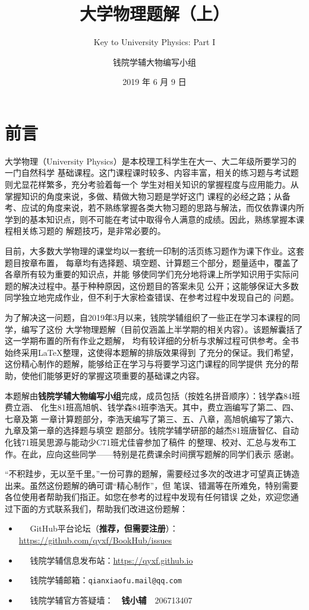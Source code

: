 \documentclass[b5paper,opensource,sourcefont,parskip]{qyxf-book}
\title{大学物理题解（上）}
\subtitle{Key to University Physics: Part I}
\author{钱院学辅大物编写小组}
\date{2019 年 6 月 9 日}
\begin{document}
\maketitle

\pagestyle{plain}
\chapter*{前言}
大学物理（University Physics）是本校理工科学生在大一、大二年级所要学习的一门自然科学
基础课程。这门课程课时较多、内容丰富，相关的练习题与考试题则尤显花样繁多，充分考验着每一个
学生对相关知识的掌握程度与应用能力。从掌握知识的角度来说，多做、精做大物习题是学好这门
课程的必经之路；从备考、应试的角度来说，若不熟练掌握各类大物习题的思路与解法，而仅依靠课内所
学到的基本知识点，则不可能在考试中取得令人满意的成绩。因此，熟练掌握本课程相关练习题的
解题技巧，是非常必要的。

目前，大多数大学物理的课堂均以一套统一印制的活页练习题作为课下作业。这套题目按章布置，
每章均有选择题、填空题、计算题三个部分，题量适中，覆盖了各章所有较为重要的知识点，并能
够使同学们充分地将课上所学知识用于实际问题的解决过程中。基于种种原因，这份题目的答案未见
公开；这能够保证大多数同学独立地完成作业，但不利于大家检查错误、在参考过程中发现自己的
问题。

为了解决这一问题，自2019年3月以来，钱院学辅组织了一些正在学习本课程的同学，编写了这份
大学物理题解（目前仅涵盖上半学期的相关内容）。该题解囊括了这一学期布置的所有作业之题解，
均有较详细的分析与求解过程可供参考。全书始终采用\LaTeX 整理，这使得本题解的排版效果得到
了充分的保证。我们希望，这份精心制作的题解，能够给正在学习与将要学习这门课程的同学提供
充分的帮助，使他们能够更好的掌握这项重要的基础课之内容。

本题解由\textbf{钱院学辅大物编写小组}完成，成员包括（按姓名拼音顺序）：钱学森84班费立涵、
化生81班高旭帆、钱学森84班李浩天。其中，费立涵编写了第二、四、七章及第
一章计算题部分，李浩天编写了第三、五、八章，高旭帆编写了第六、九章及第一章的选择题与填空
题部分。钱院学辅学研部的越杰81班唐智亿、自动化钱71班吴思源与能动少C71班尤佳睿参加了稿件
的整理、校对、汇总与发布工作。在此，应向这些同学——特别是花费课余时间撰写题解的同学们表示
感谢。

“不积跬步，无以至千里。”一份可靠的题解，需要经过多次的改进才可望真正铸造出来。虽然这份题解的确可谓“精心制作”，但
笔误、错漏等在所难免，特别需要各位使用者帮助我们指正。如您在参考的过程中发现有任何错误
之处，欢迎您通过下面的方式联系我们，帮助我们改进这份题解：
\begin{itemize}
	\item \faGithub ~~ GitHub平台论坛（\textbf{推荐，但需要注册}）：\url{https://github.com/qyxf/BookHub/issues}
	\item \faInternetExplorer ~~ 钱院学辅信息发布站：\url{https://qyxf.github.io}
	\item \faEnvelopeOpen ~~ 钱院学辅邮箱：\texttt{qianxiaofu.mail@qq.com}
	\item \faQq ~~ 钱院学辅官方答疑墙：~~\textbf{钱小辅}~~206713407
\end{itemize}
\end{document}
